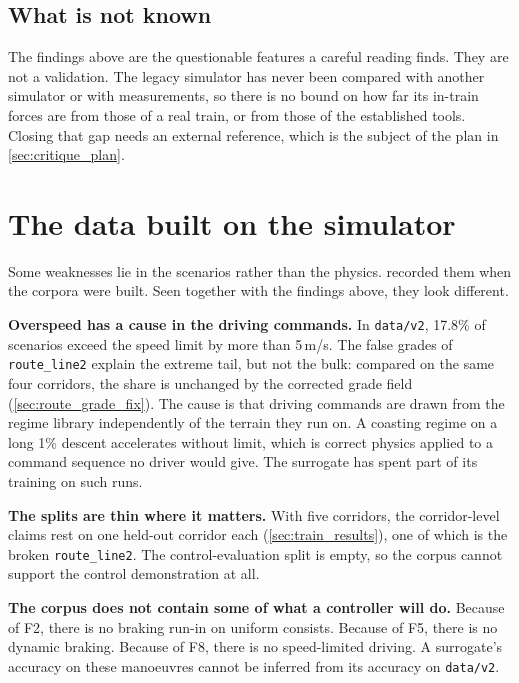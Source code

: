 \subsection{What is not known}

The findings above are the questionable features a careful reading finds. They are not a validation. The legacy simulator has never been compared with another simulator or with measurements, so there is no bound on how far its in-train forces are from those of a real train, or from those of the established tools. Closing that gap needs an external reference, which is the subject of the plan in \cref{sec:critique_plan}.

\section{The data built on the simulator}
\label{sec:critique_data}

Some weaknesses lie in the scenarios rather than the physics.  recorded them when the corpora were built. Seen together with the findings above, they look different.

\textbf{Overspeed has a cause in the driving commands.} In \texttt{data/v2}, 17.8\% of scenarios exceed the speed limit by more than 5\,m/s. The false grades of \texttt{route\_line2} explain the extreme tail, but not the bulk: compared on the same four corridors, the share is unchanged by the corrected grade field (\cref{sec:route_grade_fix}). The cause is that driving commands are drawn from the regime library independently of the terrain they run on. A coasting regime on a long 1\% descent accelerates without limit, which is correct physics applied to a command sequence no driver would give. The surrogate has spent part of its training on such runs.

\textbf{The splits are thin where it matters.} With five corridors, the corridor-level claims rest on one held-out corridor each (\cref{sec:train_results}), one of which is the broken \texttt{route\_line2}. The control-evaluation split is empty, so the corpus cannot support the control demonstration at all.

\textbf{The corpus does not contain some of what a controller will do.} Because of F2, there is no braking run-in on uniform consists. Because of F5, there is no dynamic braking. Because of F8, there is no speed-limited driving. A surrogate's accuracy on these manoeuvres cannot be inferred from its accuracy on \texttt{data/v2}.

